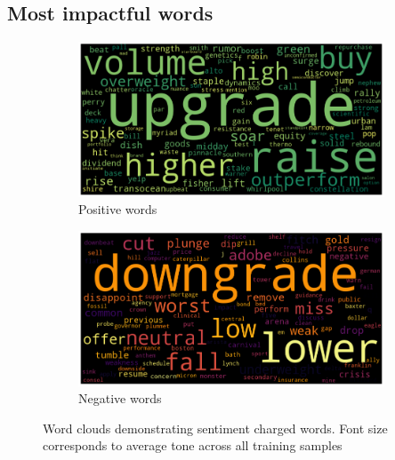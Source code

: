 \documentclass[ oneside,%
                    author={Joshua Felmeden},
                    degree={MEng},
                     title={Semantic Analysis of Financial Headlines Based on Realised Stock Returns},
                  subtitle={}]{dissertation}
\begin{document}


\subsection{Most impactful words}
\begin{figure}[ht]
\begin{subfigure}[b]{\textwidth}
\centering
\includegraphics[scale=0.4]{pics/positive.png}
\caption{Positive words}
\end{subfigure}

\begin{subfigure}[b]{\textwidth}
\centering
\includegraphics[scale=0.4]{pics/negative.png}
\caption{Negative words}
\end{subfigure}
\caption{Word clouds demonstrating sentiment charged words. Font size corresponds to average tone across all training samples}
\label{wordclouds}
\end{figure}
\end{document}

